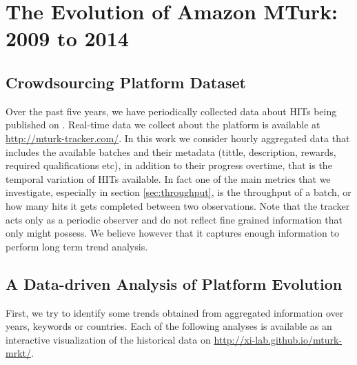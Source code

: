 \section{The Evolution of Amazon MTurk: 2009 to 2014}\label{sec:stats}


\subsection{Crowdsourcing Platform Dataset}
\label{sec:tracker}
Over the past five years, we have periodically collected data about HITs being published on \amt{}.
Real-time data we collect about the platform is available at \url{http://mturk-tracker.com/}. In this work we consider hourly aggregated data that includes the available batches and their metadata (tittle, description, rewards, required qualifications etc), in addition to their progress overtime, that is the temporal variation of HITs available. In fact one of the main metrics that we investigate, especially in section \ref{sec:throughput}, is the throughput of a batch, or how many hits it gets completed between two observations. Note that the tracker acts only as a periodic observer and do not reflect fine grained information that only \amt{} might possess. We believe however that it captures enough information to perform long term trend analysis.\\

\subsection{A Data-driven Analysis of Platform Evolution}
First, we try to identify some trends obtained from aggregated information over years, keywords or countries.  Each of the following analyses is available as an interactive visualization of the historical data on \url{http://xi-lab.github.io/mturk-mrkt/}.

